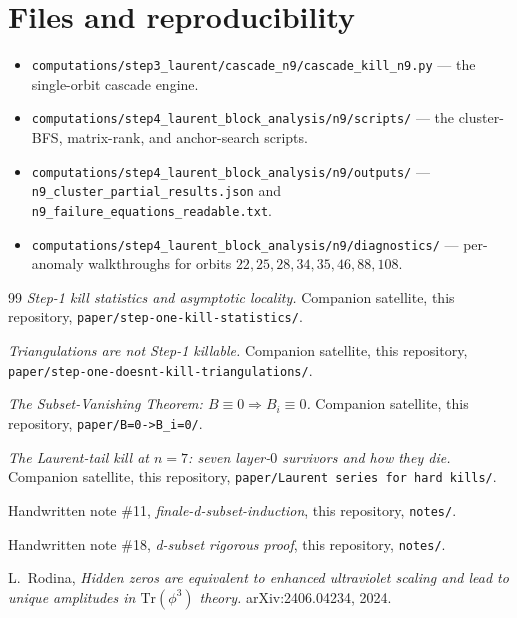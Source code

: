 \documentclass[11pt]{article}
\theoremstyle{definition}
\begin{document}
\section*{Files and reproducibility}

\begin{itemize}[leftmargin=*]
\item \verb|computations/step3_laurent/cascade_n9/cascade_kill_n9.py|
--- the single-orbit cascade engine.
\item \verb|computations/step4_laurent_block_analysis/n9/scripts/| ---
the cluster-BFS, matrix-rank, and anchor-search scripts.
\item \verb|computations/step4_laurent_block_analysis/n9/outputs/| ---
\verb|n9_cluster_partial_results.json| and
\verb|n9_failure_equations_readable.txt|.
\item \verb|computations/step4_laurent_block_analysis/n9/diagnostics/| ---
per-anomaly walkthroughs for orbits $22, 25, 28, 34, 35, 46, 88,
108$.
\end{itemize}

\begin{thebibliography}{99}
\emph{Step-1 kill statistics and asymptotic locality.}
Companion satellite, this repository,
\verb|paper/step-one-kill-statistics/|.

\emph{Triangulations are not Step-1 killable.} Companion satellite,
this repository,
\verb|paper/step-one-doesnt-kill-triangulations/|.

\emph{The Subset-Vanishing Theorem: $B\equiv 0\Rightarrow
B_i\equiv 0$.} Companion satellite, this repository,
\verb|paper/B=0->B_i=0/|.

\emph{The Laurent-tail kill at $n=7$: seven layer-$0$ survivors and
how they die.} Companion satellite, this repository,
\verb|paper/Laurent series for hard kills/|.

Handwritten note \#11, \emph{finale-d-subset-induction}, this
repository, \verb|notes/|.

Handwritten note \#18, \emph{d-subset rigorous proof}, this
repository, \verb|notes/|.

L.~Rodina,
\emph{Hidden zeros are equivalent to enhanced ultraviolet scaling
and lead to unique amplitudes in $\mathrm{Tr}(\phi^3)$ theory.}
arXiv:2406.04234, 2024.
\end{thebibliography}
\end{document}
